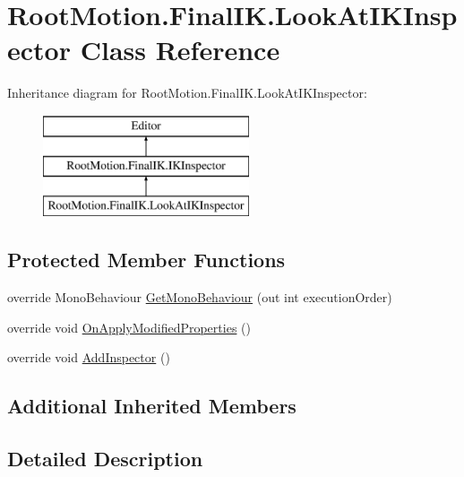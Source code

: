 \hypertarget{class_root_motion_1_1_final_i_k_1_1_look_at_i_k_inspector}{}\section{Root\+Motion.\+Final\+I\+K.\+Look\+At\+I\+K\+Inspector Class Reference}
\label{class_root_motion_1_1_final_i_k_1_1_look_at_i_k_inspector}
Inheritance diagram for Root\+Motion.\+Final\+I\+K.\+Look\+At\+I\+K\+Inspector\+:\begin{figure}[H]
\begin{center}
\leavevmode
\includegraphics[height=3.000000cm]{class_root_motion_1_1_final_i_k_1_1_look_at_i_k_inspector}
\end{center}
\end{figure}
\subsection*{Protected Member Functions}
\begin{DoxyCompactItemize}
\item 
override Mono\+Behaviour \mbox{\hyperlink{class_root_motion_1_1_final_i_k_1_1_look_at_i_k_inspector_a42e09d47ffaafec4efd8292dc4817182}{Get\+Mono\+Behaviour}} (out int execution\+Order)
\item 
override void \mbox{\hyperlink{class_root_motion_1_1_final_i_k_1_1_look_at_i_k_inspector_ad277b6a27244d6d7f71323ff324411a7}{On\+Apply\+Modified\+Properties}} ()
\item 
override void \mbox{\hyperlink{class_root_motion_1_1_final_i_k_1_1_look_at_i_k_inspector_a8f3c86ba133bbbbda630b49ccec1fb7b}{Add\+Inspector}} ()
\end{DoxyCompactItemize}
\subsection*{Additional Inherited Members}


\subsection{Detailed Description}



